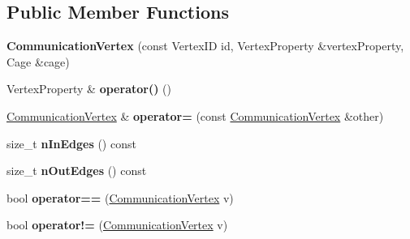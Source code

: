 \subsection*{Public Member Functions}
\begin{DoxyCompactItemize}
\item 
\hypertarget{structgraybat_1_1CommunicationVertex_aed87c447f125df835e684bad263abbd5}{}{\bfseries Communication\+Vertex} (const Vertex\+I\+D id, Vertex\+Property \&vertex\+Property, Cage \&cage)\label{structgraybat_1_1CommunicationVertex_aed87c447f125df835e684bad263abbd5}

\item 
\hypertarget{structgraybat_1_1CommunicationVertex_ac105903261ca2312c6ca0d679f26aa44}{}Vertex\+Property \& {\bfseries operator()} ()\label{structgraybat_1_1CommunicationVertex_ac105903261ca2312c6ca0d679f26aa44}

\item 
\hypertarget{structgraybat_1_1CommunicationVertex_a058aac41c1bbdc59337af4e10ad9ac40}{}\hyperlink{structgraybat_1_1CommunicationVertex}{Communication\+Vertex} \& {\bfseries operator=} (const \hyperlink{structgraybat_1_1CommunicationVertex}{Communication\+Vertex} \&other)\label{structgraybat_1_1CommunicationVertex_a058aac41c1bbdc59337af4e10ad9ac40}

\item 
\hypertarget{structgraybat_1_1CommunicationVertex_a58ceec635b5b2924734110af83518feb}{}size\+\_\+t {\bfseries n\+In\+Edges} () const \label{structgraybat_1_1CommunicationVertex_a58ceec635b5b2924734110af83518feb}

\item 
\hypertarget{structgraybat_1_1CommunicationVertex_a5705604ec15a24d75f37c7949f0884a9}{}size\+\_\+t {\bfseries n\+Out\+Edges} () const \label{structgraybat_1_1CommunicationVertex_a5705604ec15a24d75f37c7949f0884a9}

\item 
\hypertarget{structgraybat_1_1CommunicationVertex_ab50927eabcb8ac0d97bce641533990a8}{}bool {\bfseries operator==} (\hyperlink{structgraybat_1_1CommunicationVertex}{Communication\+Vertex} v)\label{structgraybat_1_1CommunicationVertex_ab50927eabcb8ac0d97bce641533990a8}

\item 
\hypertarget{structgraybat_1_1CommunicationVertex_ad2924554fd4b661f19c1bb10b8519dd5}{}bool {\bfseries operator!=} (\hyperlink{structgraybat_1_1CommunicationVertex}{Communication\+Vertex} v)\label{structgraybat_1_1CommunicationVertex_ad2924554fd4b661f19c1bb10b8519dd5}


\end{DoxyCompactItemize}
